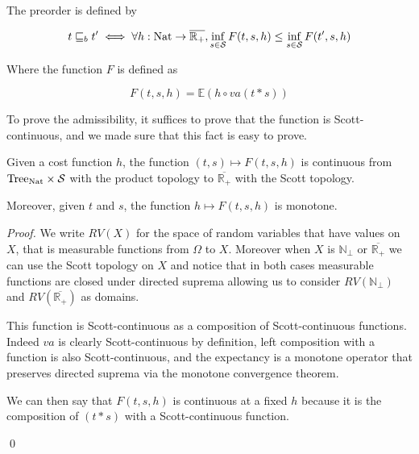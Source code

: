 \begin{adefinition}[Preorder]
    The preorder is defined by

    \begin{equation*}
        t \sqsubseteq_b t' \iff \forall h : \textnormal{Nat} \to \overline{\mathbb{R}_+}, 
        \inf_{ s \in \mathcal{S}} F (t,s,h) \leq \inf_{s \in \mathcal{S}} F (t',s,h)
    \end{equation*}

    Where the function $F$ is defined as 

    \begin{equation*}
        F(t,s,h) = \mathbb{E}(h \circ va(t * s))
    \end{equation*}
\end{adefinition}

To prove the admissibility, it suffices to prove that the function 
is Scott-continuous, and we made sure that this fact is easy to prove.

\begin{alemma}
    Given a cost function $h$, the function 
    $(t,s) \mapsto F(t,s,h)$ is continuous from $\textnormal{Tree}_{\textnormal{Nat}} \times
    \mathcal{S}$ with the product topology to $\overline{\mathbb{R}_+}$ with the 
    Scott topology.

    Moreover, given $t$ and $s$, the function $h \mapsto F(t,s,h)$ is monotone.
\end{alemma}

\begin{ensps}
\begin{proof}
    We write $RV(X)$ for the space of random variables 
    that have values on $X$, that is measurable 
    functions from $\Omega$ to $X$. Moreover when 
    $X$ is $\mathbb{N}_\bot$ or $\overline{\mathbb{R}_+}$
    we can use the Scott topology on $X$ and notice that in both cases 
    measurable functions are closed under directed suprema 
    allowing us to consider $RV(\mathbb{N}_\bot)$ and $RV(\overline{\mathbb{R}_+})$ as 
    domains.

    \begin{center}
    \end{center}

    This function is Scott-continuous as a composition of 
    Scott-continuous functions. Indeed $va$ is clearly Scott-continuous 
    by definition, left composition with a function is also
    Scott-continuous, and the expectancy is a monotone operator 
    that preserves directed suprema via the monotone convergence theorem. 

    We can then say that $F(t,s,h)$ is continuous at a fixed $h$
    because it is the composition of $(t*s)$ with a Scott-continuous 
    function.

    \qed
\end{proof}
\end{ensps}

